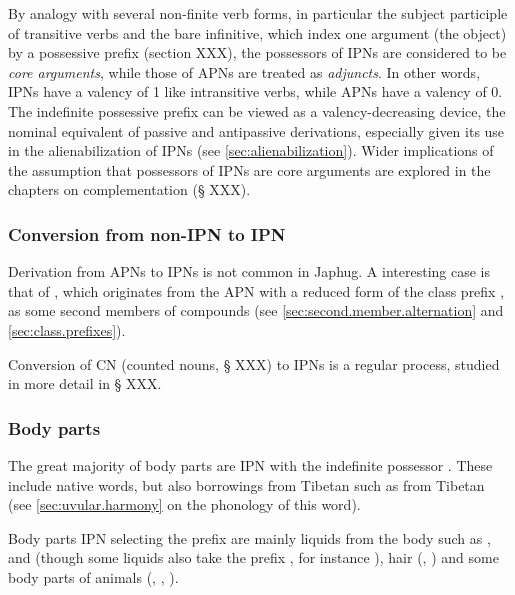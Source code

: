 By analogy with several non-finite verb forms, in particular the subject participle of transitive verbs and the bare infinitive, which index one argument (the object) by a possessive prefix (section XXX), the possessors of IPNs are considered to be \textit{core arguments}, while those of APNs are treated as \textit{adjuncts}. In other words, IPNs have a valency of 1 like intransitive verbs, while APNs have a valency of 0. The indefinite possessive prefix can be viewed as a valency-decreasing device, the nominal equivalent of passive and antipassive derivations, especially given its use in the alienabilization of IPNs (see \ref{sec:alienabilization}). Wider implications of the assumption that possessors of IPNs are core arguments are explored in the chapters on complementation (§  XXX).

\subsubsection{Conversion from non-IPN to IPN} \label{sec:apn.to.ipn}
Derivation from APNs to IPNs is not common in Japhug. A interesting case is that of , which originates from the APN  with a reduced form  of the class prefix , as some second members of compounds (see \ref{sec:second.member.alternation} and \ref{sec:class.prefixes}).

Conversion of CN (counted nouns, § XXX) to IPNs is a regular process, studied in more detail in § XXX.

\subsubsection{Body parts} \label{sec:body.part}
The great majority of body parts are IPN with the indefinite possessor . These include native words, but also borrowings from Tibetan such as  from Tibetan  (see \ref{sec:uvular.harmony} on the phonology of this word).

Body parts IPN selecting the prefix  are mainly liquids from the body such as ,  and  (though some liquids also take the prefix , for instance ), hair (, ) and some body parts of animals (, , ).

